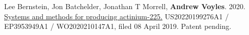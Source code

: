 \begin{bibsection}

\item Lee Bernstein, Jon Batchelder, Jonathan T Morrell, \textbf{Andrew Voyles}. 2020. \href{https://patents.google.com/patent/US20220199276A1/en}{Systems and methods for producing actinium-225.} US20220199276A1 / EP3953949A1 / WO2020210147A1, filed 08 April 2019. Patent pending.












\end{bibsection}
